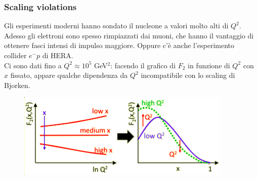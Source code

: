 \subsubsection{Scaling violations}
\begin{minipage}[t]{0.48\textwidth}
    Gli esperimenti moderni hanno sondato il nucleone a valori molto alti di $Q^2$. Adesso gli elettroni sono spesso rimpiazzati dai muoni, che hanno il vantaggio di ottenere fasci intensi di impulso maggiore. Oppure c'è anche l'esperimento collider $e^-p$ di HERA.\\
    Ci sono dati fino a $Q^2\approx10^5$ GeV$^2$: facendo il grafico di $F_2$ in funzione di $Q^2$ con $x$ fissato, appare qualche dipendenza da $Q^2$ incompatibile con lo scaling di Bjorken.
    \begin{figure}[H]
        \centering
        \includegraphics[width=\textwidth]{immagini/fig_scal_viol_sketch.png}
    \end{figure}
\end{minipage}
\hfill

